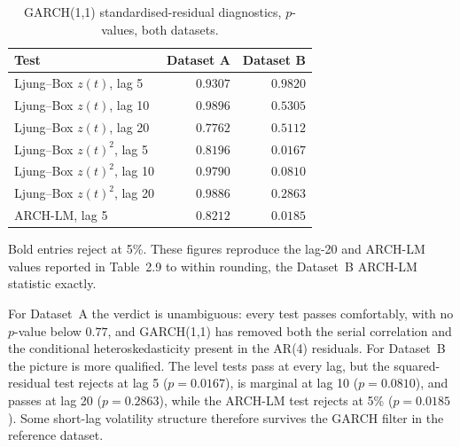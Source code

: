 \documentclass[11pt, a4paper, twoside]{article}
\begin{document}
\begin{table}[htbp]
\centering
\caption{GARCH(1,1) standardised-residual diagnostics, $p$-values, both datasets.}
\label{tab:garch-diag}
\begin{tabular}{l r r}
\toprule
\textbf{Test} & \textbf{Dataset A} & \textbf{Dataset B} \\
\midrule
Ljung--Box $z(t)$, lag 5 & $0.9307$ & $0.9820$ \\
Ljung--Box $z(t)$, lag 10 & $0.9896$ & $0.5305$ \\
Ljung--Box $z(t)$, lag 20 & $0.7762$ & $0.5112$ \\
\midrule
Ljung--Box $z(t)^2$, lag 5 & $0.8196$ & $\mathbf{0.0167}$ \\
Ljung--Box $z(t)^2$, lag 10 & $0.9790$ & $0.0810$ \\
Ljung--Box $z(t)^2$, lag 20 & $0.9886$ & $0.2863$ \\
\midrule
ARCH-LM, lag 5 & $0.8212$ & $\mathbf{0.0185}$ \\
\bottomrule
\end{tabular}
\par\vspace{4pt}
\begin{minipage}{0.92\textwidth}
\footnotesize Bold entries reject at 5\%. These figures reproduce the lag-20 and ARCH-LM values reported in Table~2.9 to within rounding, the Dataset~B ARCH-LM statistic exactly.
\end{minipage}
\end{table}

For Dataset~A the verdict is unambiguous: every test passes comfortably, with no $p$-value below $0.77$, and GARCH(1,1) has removed both the serial correlation and the conditional heteroskedasticity present in the AR(4) residuals. For Dataset~B the picture is more qualified. The level tests pass at every lag, but the squared-residual test rejects at lag 5 ($p = 0.0167$), is marginal at lag 10 ($p = 0.0810$), and passes at lag 20 ($p = 0.2863$), while the ARCH-LM test rejects at 5\% ($p = 0.0185$). Some short-lag volatility structure therefore survives the GARCH filter in the reference dataset.
\end{document}
